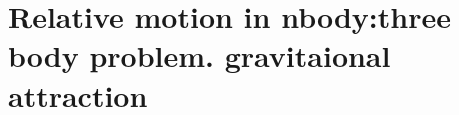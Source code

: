\section{ Relative motion in nbody:three body problem. gravitaional attraction  }\label{sec:q3}    
